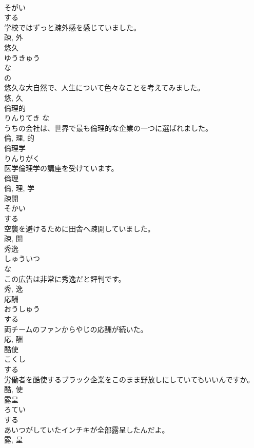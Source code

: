 \documentclass[8pt]{extreport}
\begin{document}
\begin{CJK}{UTF8}{min}
\\	そがい	
\\	する 
\\	学校ではずっと疎外感を感じていました。	
\\	疎, 外	
\\	悠久	
\\	ゆうきゅう	
\\	な 
\\	の 
\\	悠久な大自然で、人生について色々なことを考えてみました。	
\\	悠, 久	
\\	倫理的	
\\	りんりてき	な 
\\	うちの会社は、世界で最も倫理的な企業の一つに選ばれました。	
\\	倫, 理, 的	
\\	倫理学	
\\	りんりがく	
\\	医学倫理学の講座を受けています。	
\\	倫理 
\\	倫, 理, 学	
\\	疎開	
\\	そかい	
\\	する 
\\	空襲を避けるために田舎へ疎開していました。	
\\	疎, 開	
\\	秀逸	
\\	しゅういつ	
\\	な 
\\	この広告は非常に秀逸だと評判です。	
\\	秀, 逸	
\\	応酬	
\\	おうしゅう	
\\	する 
\\	両チームのファンからやじの応酬が続いた。	
\\	応, 酬	
\\	酷使	
\\	こくし	
\\	する 
\\	労働者を酷使するブラック企業をこのまま野放しにしていてもいいんですか。	
\\	酷, 使	
\\	露呈	
\\	ろてい	
\\	する 
\\	あいつがしていたインチキが全部露呈したんだよ。	
\\	露, 呈	

\end{CJK}
\end{document}
